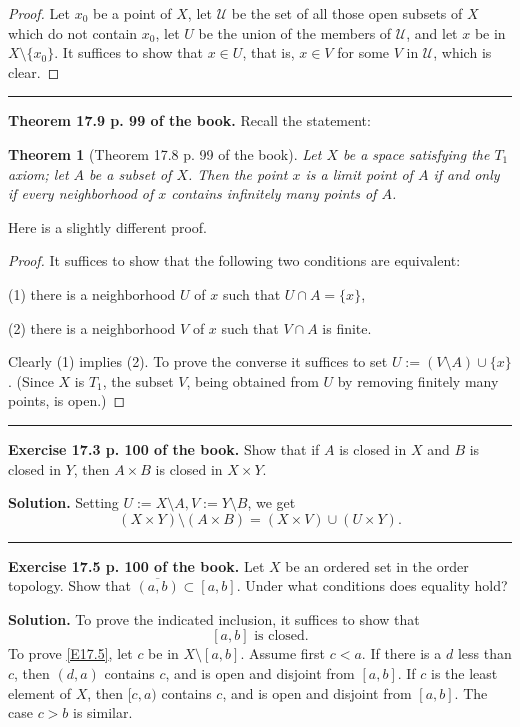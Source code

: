 \documentclass[12pt,letterpaper]{article}
\newtheorem{thm}{Theorem}%
\newcommand{\mc}{\mathcal}
\newcommand{\noi}{\noindent}%
\newcommand{\sm}{\setminus}
\begin{document}
\begin{proof}
Let $x_0$ be a point of $X$, let $\mc U$ be the set of all those open subsets of $X$ which do not contain $x_0$, let $U$ be the union of the members of $\mc U$, and let $x$ be in $X\sm\{x_0\}$. It suffices to show that $x\in U$, that is, $x\in V$ for some $V$ in $\mc U$, which is clear. 
\end{proof} 

\hrule\medskip

\noi\textbf{Theorem 17.9 p. 99 of the book.} Recall the statement: 

\begin{thm}[Theorem 17.8 p. 99 of the book]%
Let $X$ be a space satisfying the $T_1$ axiom; let $A$ be a subset of $X$. Then the point $x$ is a limit point of $A$ if and only if every neighborhood of $x$ contains infinitely many points of $A$.
\end{thm} 

Here is a slightly different proof. 

\begin{proof}
It suffices to show that the following two conditions are equivalent: 

(1) there is a neighborhood $U$ of $x$ such that $U\cap A=\{x\}$, 

(2) there is a neighborhood $V$ of $x$ such that $V\cap A$ is finite. 

\noi Clearly (1) implies (2). To prove the converse it suffices to set $U:=(V\sm A)\cup\{x\}$. (Since $X$ is $T_1$, the subset $V$, being obtained from $U$ by removing finitely many points, is open.) 
\end{proof} 

\hrule\medskip

\noi\textbf{Exercise 17.3 p. 100 of the book.} Show that if $A$ is closed in $X$ and $B$ is closed in $Y$, then $A\times B$ is closed in $X\times Y$.

\noi\textbf{Solution.} Setting $U:=X\sm A,V:=Y\sm B$, we get
$$
(X\times Y)\sm(A\times B)=(X\times V)\cup(U\times Y).
$$ 
\hrule\medskip

\noi\textbf{Exercise 17.5 p. 100 of the book.} Let $X$ be an ordered set in the order topology. Show that $\overline{(a,b)}\subset[a,b]$. Under what conditions does equality hold?

\noi\textbf{Solution.} To prove the indicated inclusion, it suffices to show that 
\begin{equation}\label{E17.5}
[a,b]\text{ is closed.}
\end{equation} 
To prove \eqref{E17.5}, let $c$ be in $X\sm[a,b]$. Assume first $c<a$. If there is a $d$ less than $c$, then $(d,a)$ contains $c$, and is open and disjoint from $[a,b]$. If $c$ is the least element of $X$, then $[c,a)$ contains $c$, and is open and disjoint from $[a,b]$. The case $c>b$ is similar. 
\end{document}
